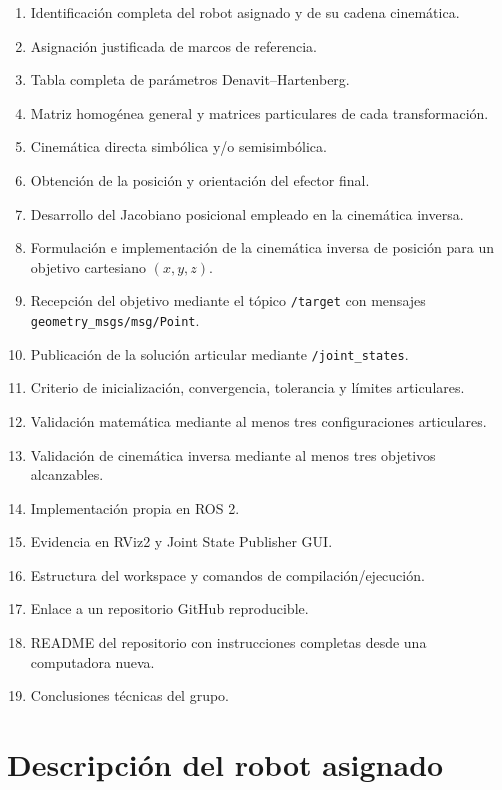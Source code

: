 \documentclass[journal]{IEEEtran}
\begin{document}
\begin{enumerate}[leftmargin=*]
    \item Identificación completa del robot asignado y de su cadena cinemática.
    \item Asignación justificada de marcos de referencia.
    \item Tabla completa de parámetros Denavit--Hartenberg.
    \item Matriz homogénea general y matrices particulares de cada transformación.
    \item Cinemática directa simbólica y/o semisimbólica.
    \item Obtención de la posición y orientación del efector final.
    \item Desarrollo del Jacobiano posicional empleado en la cinemática inversa.
    \item Formulación e implementación de la cinemática inversa de posición para un objetivo cartesiano $(x,y,z)$.
    \item Recepción del objetivo mediante el tópico \texttt{/target} con mensajes \texttt{geometry\_msgs/msg/Point}.
    \item Publicación de la solución articular mediante \texttt{/joint\_states}.
    \item Criterio de inicialización, convergencia, tolerancia y límites articulares.
    \item Validación matemática mediante al menos tres configuraciones articulares.
    \item Validación de cinemática inversa mediante al menos tres objetivos alcanzables.
    \item Implementación propia en ROS 2.
    \item Evidencia en RViz2 y Joint State Publisher GUI.
    \item Estructura del workspace y comandos de compilación/ejecución.
    \item Enlace a un repositorio GitHub reproducible.
    \item README del repositorio con instrucciones completas desde una computadora nueva.
    \item Conclusiones técnicas del grupo.
\end{enumerate}

\section{Descripción del robot asignado}
\end{document}
